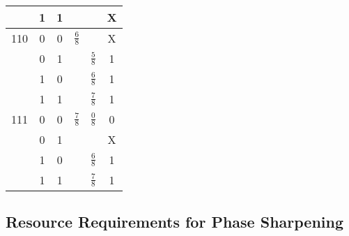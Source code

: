 \begin{tabular}{|c|c|c||c|c||c|}
    & 1 & 1 &               &               & X\\
\hline
110 & 0 & 0 & $\frac{6}{8}$ &               & X\\
    & 0 & 1 &               & $\frac{5}{8}$ & 1\\
    & 1 & 0 &               & $\frac{6}{8}$ & 1\\
    & 1 & 1 &               & $\frac{7}{8}$ & 1\\
\hline
111 & 0 & 0 & $\frac{7}{8}$ & $\frac{0}{8}$ & 0\\
    & 0 & 1 &               &               & X\\
    & 1 & 0 &               & $\frac{6}{8}$ & 1\\
    & 1 & 1 &               & $\frac{7}{8}$ & 1\\
\hline
\end{tabular}

\subsection{Resource Requirements for Phase Sharpening}
